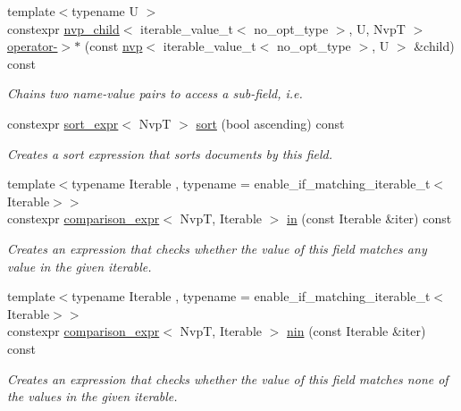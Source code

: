 \begin{DoxyCompactItemize}
\item 
{\footnotesize template$<$typename U $>$ }\\constexpr \hyperlink{classmangrove_1_1nvp__child}{nvp\+\_\+child}$<$ iterable\+\_\+value\+\_\+t$<$ no\+\_\+opt\+\_\+type $>$, U, NvpT $>$ \hyperlink{classmangrove_1_1nvp__base_a14d7eb7640f2e3ee54e6e75c32c0ffa2}{operator-\/$>$$\ast$} (const \hyperlink{classmangrove_1_1nvp}{nvp}$<$ iterable\+\_\+value\+\_\+t$<$ no\+\_\+opt\+\_\+type $>$, U $>$ \&child) const 
\begin{DoxyCompactList}\small\item\em Chains two name-\/value pairs to access a sub-\/field, i.\+e. \end{DoxyCompactList}\item 
constexpr \hyperlink{classmangrove_1_1sort__expr}{sort\+\_\+expr}$<$ NvpT $>$ \hyperlink{classmangrove_1_1nvp__base_a60b8725524a2fde6f8c9540c8445adb1}{sort} (bool ascending) const 
\begin{DoxyCompactList}\small\item\em Creates a sort expression that sorts documents by this field. \end{DoxyCompactList}\item 
{\footnotesize template$<$typename Iterable , typename  = enable\+\_\+if\+\_\+matching\+\_\+iterable\+\_\+t$<$\+Iterable$>$$>$ }\\constexpr \hyperlink{classmangrove_1_1comparison__expr}{comparison\+\_\+expr}$<$ NvpT, Iterable $>$ \hyperlink{classmangrove_1_1nvp__base_afc04b79abaca69dc454c2ea6dd7271ff}{in} (const Iterable \&iter) const 
\begin{DoxyCompactList}\small\item\em Creates an expression that checks whether the value of this field matches any value in the given iterable. \end{DoxyCompactList}\item 
{\footnotesize template$<$typename Iterable , typename  = enable\+\_\+if\+\_\+matching\+\_\+iterable\+\_\+t$<$\+Iterable$>$$>$ }\\constexpr \hyperlink{classmangrove_1_1comparison__expr}{comparison\+\_\+expr}$<$ NvpT, Iterable $>$ \hyperlink{classmangrove_1_1nvp__base_aadebfb603c05353a812e9bc8a0530793}{nin} (const Iterable \&iter) const 
\begin{DoxyCompactList}\small\item\em Creates an expression that checks whether the value of this field matches none of the values in the given iterable. \end{DoxyCompactList}\item 

\end{DoxyCompactItemize}
